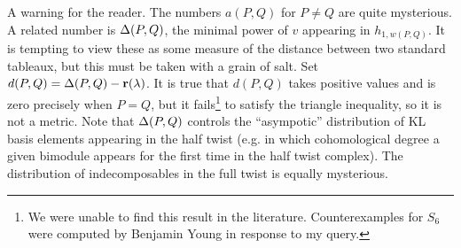\begin{remark} \label{rmk:notametric} A warning for the reader. The numbers $a(P,Q)$ for $P \ne Q$ are quite mysterious. A related number is $\Delta(P,Q)$, the minimal power of $v$ appearing
in $h_{1,w(P,Q)}$. It is tempting to view these as some measure of the distance between two standard tableaux, but this must be taken with a grain of salt. Set $d(P,Q) = \Delta(P,Q) -
\mathbf{r}(\lambda)$. It is true that $d(P,Q)$ takes positive values and is zero precisely when $P = Q$, but it fails\footnote{We were unable to find this result in the literature. Counterexamples
for $S_6$ were computed by Benjamin Young in response to my query.} to satisfy the triangle inequality, so it is not a metric. Note that $\Delta(P,Q)$ controls the ``asympotic'' distribution
of KL basis elements appearing in the half twist (e.g. in which cohomological degree a given bimodule appears for the first time in the half twist complex). The distribution of
indecomposables in the full twist is equally mysterious. \end{remark}






